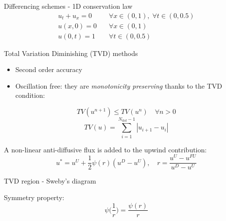 \documentclass{beamer}
\begin{document}
\begin{frame}{Differencing schemes - 1D conservation law}
\vspace{-0.5cm}
	\begin{align*}
		u_t + u_x = 0 \quad &\forall x \in (0, 1), \; \forall t \in (0, 0.5)\\
		u(x, 0) = 0 \quad &\forall x \in (0, 1)\\
		u(0, t) = 1 \quad &\forall t \in (0, 0.5)
	\end{align*}
	\vspace{-1cm}
	\begin{figure}
		\centering
		
	\end{figure}
\end{frame}
\begin{frame}{Total Variation Diminishing (TVD) methods}
\begin{itemize}
	\item Second order accuracy
	\item Oscillation free: they are \emph{monotonicity preserving} thanks to 
	the TVD condition:
\end{itemize}
\vspace{0.3cm}
\begin{equation*}
	TV(u^{n+1}) \leq TV(u^n) \quad \forall n>0
\end{equation*}
\begin{equation*}
	TV(u) = 
	\sum_{i=1}^{N_\text{dof}-1} |u_{i+1} - u_i|
\end{equation*}

\vspace{0.3cm}
A non-linear anti-diffusive flux is added to the upwind contribution:
\begin{equation*}
u^* = u^U + \frac{1}{2} \psi(r)(u^D - u^U), \quad r = \frac{u^U - u^{FU}}{u^D 
- u^U}
\end{equation*}
\end{frame}
\begin{frame}{TVD region - Sweby's diagram}
\begin{minipage}[t]{0.68\textwidth}
\begin{figure}
	\centering
	\hspace{-1.24cm}
	
\end{figure}
\end{minipage}
\begin{minipage}[t]{0.30\textwidth}
	\vspace{2cm}
	Symmetry property:
	\begin{equation*}
	\psi\bigg(\frac{1}{r}\bigg) = \frac{\psi(r)}{r}
	\end{equation*}
\end{minipage}
\end{frame}
\end{document}

